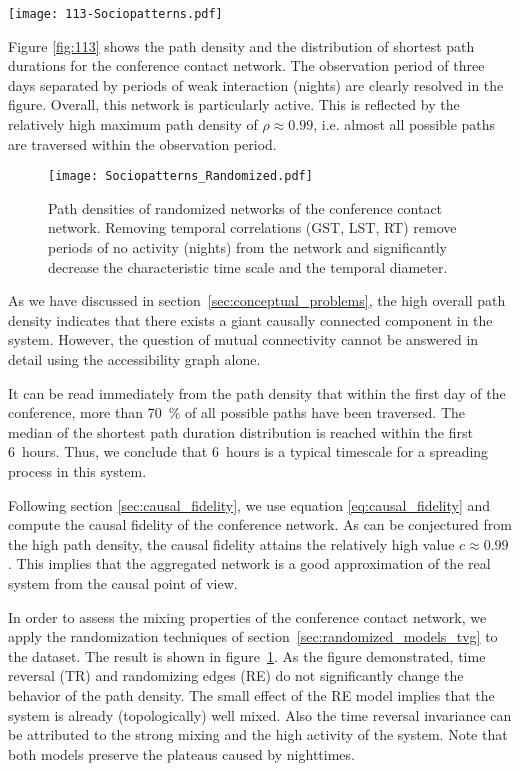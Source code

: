 \begin{SCfigure}
\texttt{[image: 113-Sociopatterns.pdf]}
\caption{Unfolding accessibility of a conference contact network.
The fast saturation behavior and the high maximum of the path density suggest a high degree of mixing in this system.}
\label{fig:113}
\end{SCfigure}
%
Figure \ref{fig:113} shows the path density and the distribution of shortest path durations for the conference contact network.
The observation period of three days separated by periods of weak interaction (nights) are clearly resolved in the figure.
Overall, this network is particularly active.
This is reflected by the relatively high maximum path density of $\rho \approx 0.99$, i.e. almost all possible paths are traversed within the observation period.
%
\begin{figure}[h!]
\begin{center}
\texttt{[image: Sociopatterns\_Randomized.pdf]}
\caption{Path densities of randomized networks of the conference contact network.
Removing temporal correlations (GST, LST, RT) remove periods of no activity (nights) from the network and significantly decrease the characteristic time scale and the temporal diameter.}
\label{fig:113_random}
\end{center}
\end{figure}
%
As we have discussed in section~\ref{sec:conceptual_problems}, the high overall path density indicates that there exists a giant causally connected component in the system.
However, the question of mutual connectivity cannot be answered in detail using the accessibility graph alone.

It can be read immediately from the path density that within the first day of the conference, more than 70~\% of all possible paths have been traversed.
The median of the shortest path duration distribution is reached within the first 6~hours.
Thus, we conclude that 6~hours is a typical timescale for a spreading process in this system.

Following section \ref{sec:causal_fidelity}, we use equation \eqref{eq:causal_fidelity} and compute the causal fidelity of the conference network.
As can be conjectured from the high path density, the causal fidelity attains the relatively high value $c\approx 0.99$.
This implies that the aggregated network is a good approximation of the real system from the causal point of view.

In order to assess the mixing properties of the conference contact network, we apply the randomization techniques of section~\ref{sec:randomized_models_tvg} to the dataset.
The result is shown in figure~\ref{fig:113_random}.
As the figure demonstrated, time reversal (TR) and randomizing edges (RE) do not significantly change the behavior of the path density.
The small effect of the RE model implies that the system is already (topologically) well mixed.
Also the time reversal invariance can be attributed to the strong mixing and the high activity of the system.
Note that both models preserve the plateaus caused by nighttimes.

